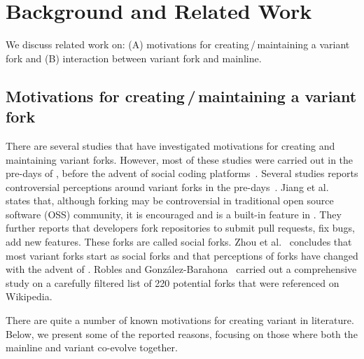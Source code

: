 
\section{Background and Related Work}
\label{sec:background}
We discuss related work on: (A) motivations for creating\,/\,maintaining a variant fork and (B) interaction between variant fork and mainline.%



\subsection{Motivations for creating\,/\,maintaining a variant fork}
\label{sec:motivations}

There are several studies that have investigated motivations for creating and maintaining variant forks. However, most of these studies were carried out in the pre-\gh days of \sourceforge, before the advent of social coding platforms~\cite{Linus:2012Perspectives,Gregorio:2012,Viseur:2012Forks,Linus:2013CodeForking,Laurent:2008,Linus:2011ToFork}. Several studies reports controversial perceptions around variant forks in the pre-\gh days~\cite{Chua:Forking:2017,Dixion:2009Forks,Ernst:2010,Linus:2011ToFork,Linus:2014Hackers,Raymond:Cathedral:2001,pete}.
Jiang et al.~\cite{Lo:2017} states that, although forking may be controversial in traditional open source software (OSS) community, it is encouraged and is a built-in feature in \gh. They further reports that developers fork repositories to submit pull requests, fix bugs, add new features. These forks are called social forks.
Zhou et al.~\cite{Zhou:2020} concludes that most variant forks start as social forks
and that perceptions of forks have changed with the advent of \gh.
Robles and Gonz{\'a}lez-Barahona~\cite{Gregorio:2012} carried out a comprehensive study on a carefully filtered list of 220 potential forks that were referenced on Wikipedia. %

There are quite a number of known motivations for creating variant in literature. Below, we present some of the reported reasons, focusing on those where both the mainline and variant co-evolve together.

